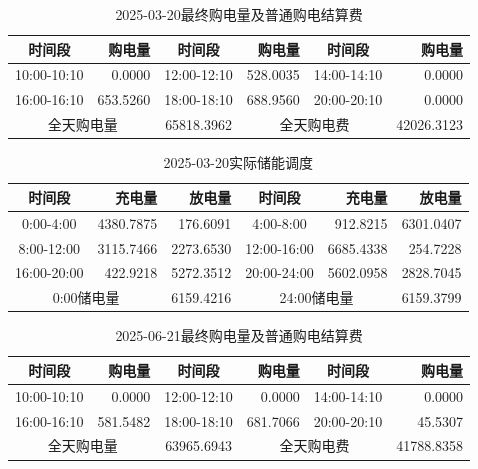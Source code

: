 \begin{table}[htbp]\centering
\caption{2025-03-20最终购电量及普通购电结算费}
\begin{tabular}{|c|r|c|r|c|r|}\hline
时间段 & 购电量 & 时间段 & 购电量 & 时间段 & 购电量 \\ \hline
10:00-10:10 & 0.0000 & 12:00-12:10 & 528.0035 & 14:00-14:10 & 0.0000 \\ \hline
16:00-16:10 & 653.5260 & 18:00-18:10 & 688.9560 & 20:00-20:10 & 0.0000 \\ \hline
\multicolumn{2}{|c|}{全天购电量} & 65818.3962 & \multicolumn{2}{c|}{全天购电费} & 42026.3123 \\ \hline
\end{tabular}\end{table}
\begin{table}[htbp]\centering
\caption{2025-03-20实际储能调度}
\begin{tabular}{|c|r|r|c|r|r|}\hline
时间段 & 充电量 & 放电量 & 时间段 & 充电量 & 放电量 \\ \hline
0:00-4:00 & 4380.7875 & 176.6091 & 4:00-8:00 & 912.8215 & 6301.0407 \\ \hline
8:00-12:00 & 3115.7466 & 2273.6530 & 12:00-16:00 & 6685.4338 & 254.7228 \\ \hline
16:00-20:00 & 422.9218 & 5272.3512 & 20:00-24:00 & 5602.0958 & 2828.7045 \\ \hline
\multicolumn{2}{|c|}{0:00储电量} & 6159.4216 & \multicolumn{2}{c|}{24:00储电量} & 6159.3799 \\ \hline
\end{tabular}\end{table}
\begin{table}[htbp]\centering
\caption{2025-06-21最终购电量及普通购电结算费}
\begin{tabular}{|c|r|c|r|c|r|}\hline
时间段 & 购电量 & 时间段 & 购电量 & 时间段 & 购电量 \\ \hline
10:00-10:10 & 0.0000 & 12:00-12:10 & 0.0000 & 14:00-14:10 & 0.0000 \\ \hline
16:00-16:10 & 581.5482 & 18:00-18:10 & 681.7066 & 20:00-20:10 & 45.5307 \\ \hline
\multicolumn{2}{|c|}{全天购电量} & 63965.6943 & \multicolumn{2}{c|}{全天购电费} & 41788.8358 \\ \hline
\end{tabular}\end{table}
